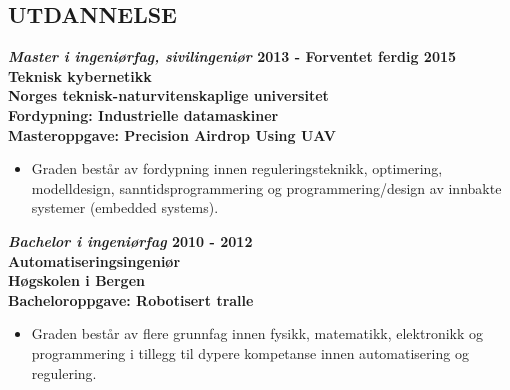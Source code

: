 \documentclass[margin, 10pt, norsk]{res} %
\begin{document}
\begin{resume}

 



\section{UTDANNELSE}

\textbf{\emph{Master i ingeniørfag, sivilingeniør} \hfill 2013 - Forventet ferdig 2015
\\Teknisk kybernetikk  \\
Norges teknisk-naturvitenskaplige universitet \\
Fordypning: Industrielle datamaskiner\\
Masteroppgave: Precision Airdrop Using UAV   } 
\begin{itemize} \itemsep -2pt %
\item Graden består av fordypning innen reguleringsteknikk, optimering, modelldesign, sanntidsprogrammering og programmering/design av innbakte systemer (embedded systems).
\end{itemize}

\textbf{\emph{Bachelor i ingeniørfag }\hfill 2010 - 2012\\
Automatiseringsingeniør \\
Høgskolen i Bergen \\
Bacheloroppgave: Robotisert tralle  } %
\begin{itemize} \itemsep -2pt %
\item Graden består av flere grunnfag innen fysikk, matematikk, elektronikk og programmering i tillegg til dypere kompetanse innen automatisering og regulering. 
\end{itemize}


\end{resume}
\end{document}
